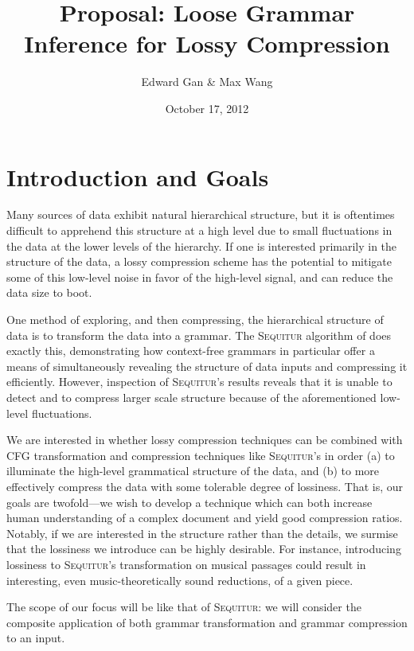 \documentclass[11pt]{article}
\newcommand{\Sequitur}{\textsc{Sequitur}\xspace}
\begin{document}


\title{Proposal: Loose Grammar Inference for Lossy Compression}
\author{Edward Gan \& Max Wang}
\date{October 17, 2012}
\maketitle

\section{Introduction and Goals}

Many sources of data exhibit natural hierarchical structure, but it is
oftentimes difficult to apprehend this structure at a high level due to small
fluctuations in the data at the lower levels of the hierarchy.  If one is
interested primarily in the structure of the data, a lossy compression scheme
has the potential to mitigate some of this low-level noise in favor of the
high-level signal, and can reduce the data size to boot.

One method of exploring, and then compressing, the hierarchical structure of
data is to transform the data into a grammar.  The \Sequitur algorithm of
\cite{sequitur} does exactly this, demonstrating how context-free grammars in
particular offer a means of simultaneously revealing the structure of data
inputs and compressing it efficiently.  However, inspection of \Sequitur's
results reveals that it is unable to detect and to compress larger scale
structure because of the aforementioned low-level fluctuations.

We are interested in whether lossy compression techniques can be combined with
CFG transformation and compression techniques like \Sequitur's in order (a) to
illuminate the high-level grammatical structure of the data, and (b) to more
effectively compress the data with some tolerable degree of lossiness.  That
is, our goals are twofold---we wish to develop a technique which can both
increase human understanding of a complex document and yield good compression
ratios.  Notably, if we are interested in the structure rather than the
details, we surmise that the lossiness we introduce can be highly desirable.
For instance, introducing lossiness to \Sequitur's transformation on musical
passages could result in interesting, even music-theoretically sound
reductions, of a given piece.

The scope of our focus will be like that of \Sequitur: we will consider the
composite application of both grammar transformation and grammar compression to
an input.
\end{document}
